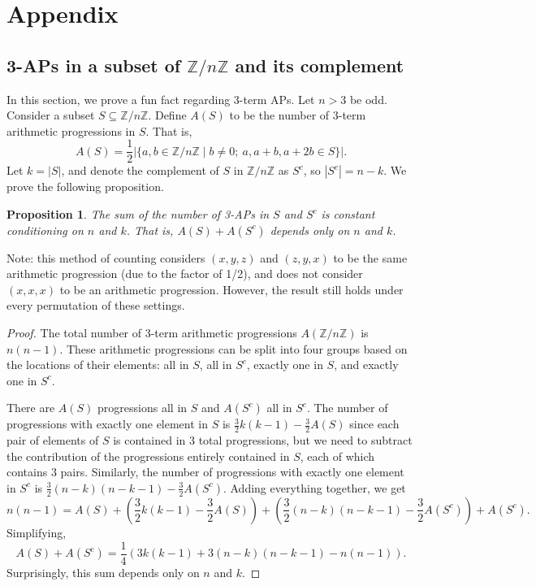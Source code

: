 \documentclass[12pt]{article} %
\newcommand{\f}[2]{\frac{#1}{#2}}
\newcommand{\p}[1]{\left(#1\right)}
\newcommand{\abs}[1]{\left\lvert#1\right\rvert}
\newcommand{\Z}{\mathbb{Z}}
\newtheorem{prop}[thm]{Proposition}
\theoremstyle{definition}
\theoremstyle{definition}
\begin{document}
\section{Appendix}
\subsection{3-APs in a subset of $\Z/n\Z$ and its complement}
In this section, we prove a fun fact regarding 3-term APs.
	Let $n > 3$ be odd. Consider a subset $S \subseteq \Z/n\Z$. Define $A(S)$ to be the number of 3-term arithmetic progressions in $S$. That is,
	\[ A(S) = \frac{1}{2} \abs{\{a, b \in \Z/n\Z \mid b \neq 0;\ a, a + b, a + 2b \in S \}}. \]
	Let $k = \abs{S}$, and denote the complement of $S$ in $\Z/n\Z$ as $S^c$, so $\abs{S^c} = n - k$. We prove the following proposition.
    
    \begin{prop}
    The sum of the number of 3-APs in $S$ and $S^c$ is constant conditioning on $n$ and $k$. That is, $A(S) + A(S^c)$ depends only on $n$ and $k$.
    \end{prop}
    
    Note: this method of counting considers $(x, y, z)$ and $(z, y, x)$ to be the same arithmetic progression (due to the factor of 1/2), and does not consider $(x, x, x)$ to be an arithmetic progression. However, the result still holds under every permutation of these settings.

\begin{proof}

	The total number of 3-term arithmetic progressions $A(\Z/n\Z)$ is $n(n-1)$. These arithmetic progressions can be split into four groups based on the locations of their elements: all in $S$, all in $S^c$, exactly one in $S$, and exactly one in $S^c$.

	There are $A(S)$ progressions all in $S$ and $A(S^c)$ all in $S^c$. The number of progressions with exactly one element in $S$ is $\f{3}{2}k(k-1) - \f{3}{2}A(S)$ since each pair of elements of $S$ is contained in $3$ total progressions, but we need to subtract the contribution of the progressions entirely contained in $S$, each of which contains $3$ pairs. Similarly, the number of progressions with exactly one element in $S^c$ is $\f{3}{2}(n-k)(n-k-1) - \f{3}{2}A(S^c)$. Adding everything together, we get
	\[ n(n-1) = A(S) + \p{\f{3}{2}k(k-1) - \f{3}{2}A(S)} + \p{\f{3}{2}(n-k)(n-k-1) - \f{3}{2}A(S^c)} + A(S^c). \]
	Simplifying,
	\[ A(S) + A(S^c) = \f{1}{4}\p{3k(k-1) + 3(n-k)(n-k-1) - n(n-1)}. \]
	Surprisingly, this sum depends only on $n$ and $k$.
    
\end{proof}
\end{document}
